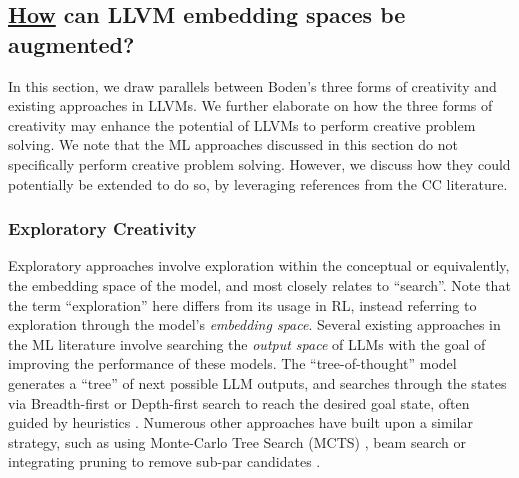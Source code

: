 \subsection{\underline{How} can LLVM embedding spaces be augmented?}
In this section, we draw parallels between Boden's three forms of creativity and existing approaches in LLVMs. We further elaborate on how the three forms of creativity may enhance the potential of LLVMs to perform creative problem solving. We note that the ML approaches discussed in this section do not specifically perform creative problem solving. However, we discuss how they could potentially be extended to do so, by leveraging references from the CC literature.

\subsubsection{Exploratory Creativity}
\label{subsubsec:exploratory}
Exploratory approaches involve exploration within the conceptual or equivalently, the embedding space of the model, and most closely relates to ``search''. Note that the term ``exploration'' here differs from its usage in RL, instead referring to exploration through the model's \textit{embedding space}. Several existing approaches in the ML literature involve searching the \textit{output space} of LLMs with the goal of improving the performance of these models. The ``tree-of-thought'' model generates a ``tree'' of next possible LLM outputs, and searches through the states via Breadth-first or Depth-first search to reach the desired goal state, often guided by heuristics \cite{yao2023tree}. Numerous other approaches have built upon a similar strategy, such as using Monte-Carlo Tree Search (MCTS) \cite{zhou2023language,feng2023alphazero}, beam search \cite{zhang2023planning} or integrating pruning to remove sub-par candidates \cite{golovneva2023pathfinder}.

